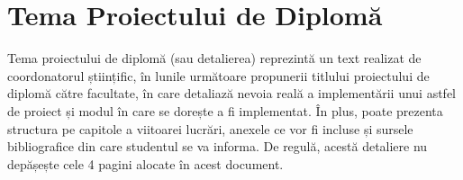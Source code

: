 \chapter*{Tema Proiectului de Diplomă}

\thispagestyle{front}
\pagestyle{front}

{
    \color{gray}
    Tema proiectului de diplomă (sau detalierea) reprezintă un text realizat de coordonatorul științific, în lunile următoare propunerii titlului proiectului de diplomă către facultate, în care detaliază nevoia reală a implementării unui astfel de proiect și modul în care se dorește a fi implementat. În plus, poate prezenta structura pe capitole a viitoarei lucrări, anexele ce vor fi incluse și sursele bibliografice din care studentul se va informa. De regulă, acestă deta\-liere nu depășește cele 4 pagini alocate în acest document.
}


\newpage \
\newpage \
\newpage \
\newpage